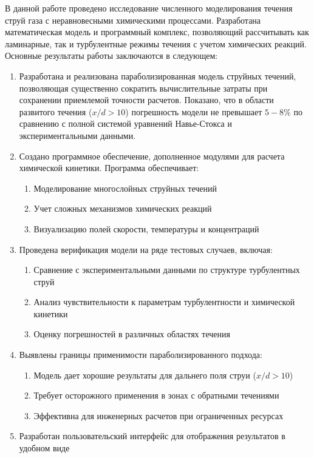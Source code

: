 \conclusion

В данной работе проведено исследование численного моделирования течения струй газа с неравновесными химическими процессами. Разработана математическая модель и программный комплекс, позволяющий рассчитывать как ламинарные, так и турбулентные режимы течения с учетом химических реакций. Основные результаты работы заключаются в следующем:

\begin{enumerate}[arabic]
\item Разработана и реализована параболизированная модель струйных течений, позволяющая существенно сократить вычислительные затраты при сохранении приемлемой точности расчетов. Показано, что в области развитого течения ($x/d > 10$) погрешность модели не превышает $5-8\%$ по сравнению с полной системой уравнений Навье-Стокса и экспериментальными данными.
\item Создано программное обеспечение, дополненное модулями для расчета химической кинетики. Программа обеспечивает:
\begin{enumerate}
    \item Моделирование многослойных струйных течений
    \item Учет сложных механизмов химических реакций
    \item Визуализацию полей скорости, температуры и концентраций
\end{enumerate}
\item Проведена верификация модели на ряде тестовых случаев, включая:
\begin{enumerate}
    \item Сравнение с экспериментальными данными по структуре турбулентных струй
    \item Анализ чувствительности к параметрам турбулентности и химической кинетики
    \item Оценку погрешностей в различных областях течения
\end{enumerate}
\item Выявлены границы применимости параболизированного подхода:
\begin{enumerate}
    \item Модель дает хорошие результаты для дальнего поля струи ($x/d > 10$)
    \item Требует осторожного применения в зонах с обратными течениями
    \item Эффективна для инженерных расчетов при ограниченных ресурсах
\end{enumerate}
\item Разработан пользовательский интерфейс для отображения результатов в удобном виде
\end{enumerate}

